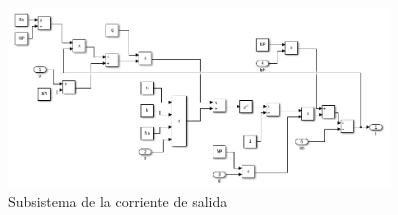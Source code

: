\documentclass[a4paper,12pt]{article}
\begin{document}
\begin{itemize}
			\begin{figure}[htb]
				\centering
				\includegraphics[width=0.9\textwidth]{./imagenes/simulink7.png}
				\caption{Subsistema de la corriente de salida}
			\end{figure} 
		
		
		
		
		
		
		
		
		
		
		
	\end{itemize}
	
	
	 
	
	 
	

	
	
	
	
	

	

	
\end{document}
